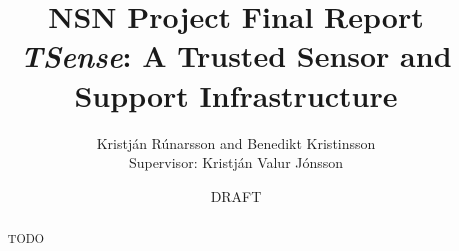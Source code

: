 \documentclass[10pt,a4paper]{report}
\author{Kristj\'{a}n R\'{u}narsson and Benedikt Kristinsson \\Supervisor: Kristj\'{a}n Valur J\'{o}nsson}
\title{NSN Project Final Report\\\textit{TSense}: A Trusted Sensor and Support Infrastructure}
\date{DRAFT}
\begin{document}
\maketitle


\begin{abstract}
TODO
\end{abstract}








\end{document}
